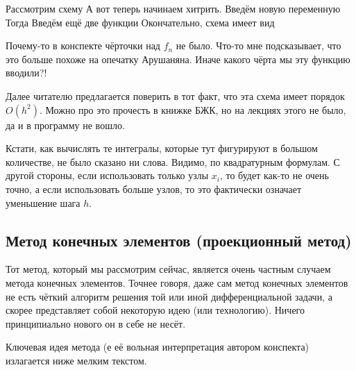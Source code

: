 \documentclass[a4paper]{article}
\begin{document}
Рассмотрим схему   А вот теперь начинаем хитрить. Введём новую переменную
  Тогда   Введём ещё
две функции   Окончательно, схема имеет вид

\begin{petit}
Почему-то в конспекте чёрточки над $f_n$ не было. Что-то мне
подсказывает, что это больше похоже на опечатку Арушаняна.  Иначе
какого чёрта мы эту функцию вводили?!
\end{petit}

Далее читателю предлагается поверить в тот факт, что эта схема имеет
порядок $O(h^2)$.  Можно про это прочесть в книжке БЖК, но на лекциях
этого не было, да и в программу не вошло.

\begin{petit}
Кстати, как вычислять те интегралы, которые тут фигурируют в большом
количестве, не было сказано ни слова.  Видимо, по квадратурным
формулам. С другой стороны, если использовать только узлы $x_i$, то
будет как-то не очень точно, а если использовать больше узлов, то это
фактически означает уменьшение шага $h$.
\end{petit}






\subsection{Метод конечных элементов (проекционный метод)}

Тот метод, который мы рассмотрим сейчас, является очень частным
случаем метода конечных элементов.  Точнее говоря, даже сам метод
конечных элементов не есть чёткий алгоритм решения той или иной
дифференциальной задачи, а скорее представляет собой некоторую идею
(или технологию). Ничего принципиально нового он в себе не несёт.

Ключевая идея метода (е её вольная интерпретация автором конспекта)
излагается ниже мелким текстом.
\end{document}
